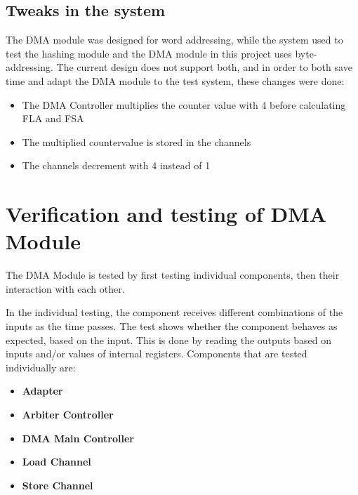 \begin{appendix}
\subsection{Tweaks in the system}
The DMA module was designed for word addressing, while the system used to test the hashing module and the DMA module in this project uses byte-addressing.
The current design does not support both, and in order to both save time and adapt the DMA module to the test system, these changes were done:
\begin{itemize}
    \item The DMA Controller multiplies the counter value with 4 before calculating FLA and FSA
    \item The multiplied countervalue is stored in the channels
    \item The channels decrement with 4 instead of 1 
\end{itemize}

\section{Verification and testing of DMA Module}

The DMA Module is tested by first testing individual components, then their interaction with each other.

In the individual testing, the component receives different combinations of the inputs as the time passes.
The test shows whether the component behaves as expected, based on the input.
This is done by reading the outputs based on inputs and/or values of internal registers.
Components that are tested individually are:
\begin{itemize}
    \item \textbf{Adapter} 
    \item \textbf{Arbiter Controller}
    \item \textbf{DMA Main Controller}
    \item \textbf{Load Channel}
    \item \textbf{Store Channel}
\end{itemize}


\end{appendix}
